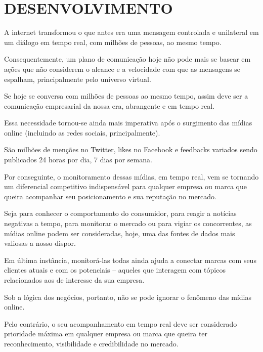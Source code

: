 
\chapter{DESENVOLVIMENTO}

A internet transformou o que antes era uma mensagem controlada e unilateral em um diálogo em tempo real, com milhões de pessoas, ao mesmo tempo.

Consequentemente, um plano de  comunicação  hoje não pode mais se basear em ações que não considerem o alcance e a velocidade com que as mensagens se espalham, principalmente pelo universo virtual.

Se hoje se conversa com milhões de pessoas ao mesmo tempo, assim deve ser a comunicação empresarial da nossa era, abrangente e em tempo real.

Essa necessidade tornou-se ainda mais imperativa após o surgimento das mídias online (incluindo as redes sociais, principalmente).

São milhões de menções no Twitter, likes no Facebook e feedbacks variados sendo publicados 24 horas por dia, 7 dias por semana.

Por conseguinte, o monitoramento dessas mídias, em tempo real, vem se tornando um diferencial competitivo indispensável para qualquer empresa ou marca que queira acompanhar seu posicionamento e sua reputação no mercado.

Seja para conhecer o comportamento do consumidor, para reagir a notícias negativas a tempo, para monitorar o mercado ou para vigiar os concorrentes, as mídias online podem ser consideradas, hoje, uma das fontes de dados mais valiosas a nosso dispor.

Em última instância, monitorá-las todas ainda ajuda a conectar marcas com seus clientes atuais e com os potenciais – aqueles que interagem com tópicos relacionados aos de interesse da sua empresa.

Sob a lógica dos negócios, portanto, não se pode ignorar o fenômeno das mídias online.

Pelo contrário, o seu acompanhamento em tempo real deve ser considerado prioridade máxima em qualquer empresa ou marca que queira ter reconhecimento, visibilidade e credibilidade no mercado. \cite{cortex}

